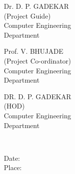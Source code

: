 \documentclass[10pt,a4paper]
{article}
\numberwithin{table}{section}
\begin{document}
\vspace{0.5 in}
\begin{minipage}[t]{7cm}
\flushleft
\hspace{0.4in} Dr. D. P. GADEKAR\\
\hspace{0.5in}(Project Guide)\\
\hspace{0.25in} Computer Engineering\\
\hspace{0.55in} Department
\end{minipage}
\hspace{0.5 in}
\begin{minipage}[t]{7cm}

\hspace{1.4in} Prof. V. BHUJADE\\
\hspace*{1.4 in}(Project Co-ordinator)\\ \hspace*{1.3 in} Computer Engineering\\
\hspace*{1.6in} Department
\end{minipage}
\vspace{0.9 in}

\begin{minipage}[t]{7.8cm}
\flushleft
\hspace{0.3in}DR. D. P. GADEKAR\\
\hspace{0.65in}(HOD)\\
\hspace*{0.25in}Computer Engineering\\
\hspace*{0.55in}Department
\end{minipage}
\hspace{0.5 in}
\begin{minipage}[t]{7cm}


\end{minipage}
\\
\vspace{0.5 in}

\begin{minipage}[t]{7.8cm}
\flushleft
\hspace{0.3in}Date:\\
\hspace{0.3in}Place:\\
\end{minipage}
\end{document}
